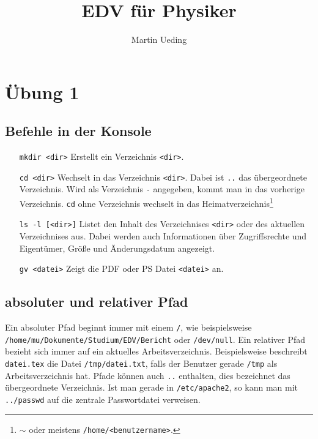 \documentclass[12pt]{article}
\title{EDV für Physiker}
\author{Martin Ueding}
\begin{document}
\maketitle

\newpage
\tableofcontents
\newpage

\section{Übung 1}

\subsection{Befehle in der Konsole}

\begin{itemize}

\item[\texttt{mkdir <dir>}] Erstellt ein Verzeichnis \texttt{<dir>}.
\item[\texttt{cd <dir>}] Wechselt in das Verzeichnis \texttt{<dir>}. Dabei ist \texttt{..} das übergeordnete Verzeichnis. Wird als Verzeichnis \texttt{-} angegeben, kommt man in das vorherige Verzeichnis. \texttt{cd} ohne Verzeichnis wechselt in das Heimatverzeichnis\footnote{\texttt{$\sim$} oder meistens \texttt{/home/<benutzername>}.}
\item[\texttt{ls -l [<dir>]}] Listet den Inhalt des Verzeichnises \texttt{<dir>} oder des aktuellen Verzeichnises aus. Dabei werden auch Informationen über Zugriffsrechte und Eigentümer, Größe und Änderungsdatum angezeigt.
\item[\texttt{gv <datei>}] Zeigt die PDF oder PS Datei \texttt{<datei>} an.
\end{itemize}

\subsection{absoluter und relativer Pfad}

Ein absoluter Pfad beginnt immer mit einem \texttt{/}, wie beispielsweise \texttt{/home/\-mu/\-Dokumente/\-Studium/\-EDV/\-Bericht} oder \texttt{/dev/null}. Ein relativer Pfad bezieht sich immer auf ein aktuelles Arbeitsverzeichnis. Beispielsweise beschreibt \texttt{datei.tex} die Datei \texttt{/tmp/datei.txt}, falls der Benutzer gerade \texttt{/tmp} als Arbeitsverzeichnis hat. Pfade können auch \texttt{..} enthalten, dies bezeichnet das übergeordnete Verzeichnis. Ist man gerade in \texttt{/etc/apache2}, so kann man mit \texttt{../passwd} auf die zentrale Passwortdatei verweisen.
\end{document}
